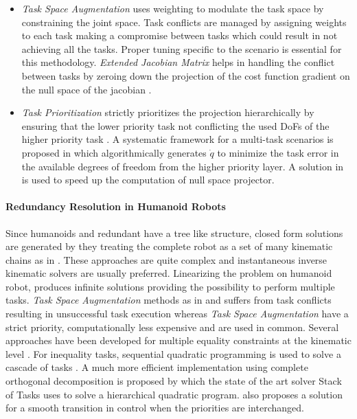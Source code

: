  \begin{itemize}
     \item \textit{Task Space Augmentation} uses weighting to modulate the task space by constraining the joint space\cite{sciavicco1987solving}. Task conflicts are managed by assigning weights to each task making a compromise between tasks which could 
     result in not achieving all the tasks. Proper tuning specific to the scenario is essential for this methodology. \textit{Extended Jacobian Matrix} helps in handling the conflict between tasks by zeroing down the projection of the cost function gradient on the null space of the jacobian \cite{baillieul1985kinematic}.

     \item \textit{Task Prioritization} strictly prioritizes the projection hierarchically by ensuring that the lower priority task not conflicting the used DoFs of the higher priority task \cite{nakamura1987task}. A systematic framework for a multi-task scenarios is proposed in \cite{siciliano1991general} which algorithmically generates $\dot{q}$ to minimize the task error in the available degrees of freedom from the higher priority layer. A solution in \cite{Baerlocher1998} is used to speed up the computation of null space projector. 
     
 \end{itemize}

\paragraph{Redundancy Resolution in Humanoid Robots}
Since humanoids and redundant have a tree like structure, closed form solutions are generated by they treating the complete robot as a set of many kinematic chains as in \cite{ali2010closed,nunez2012explicit}. These approaches are quite complex and instantaneous inverse kinematic solvers are usually preferred. Linearizing the problem on humanoid robot, produces infinite solutions providing the possibility to perform multiple tasks. \textit{Task Space Augmentation} methods as in \cite{tevatia2000inverse} and \cite{salini2009lqp}suffers from task conflicts resulting in unsuccessful task execution whereas \textit{Task Space Augmentation} have a strict priority, computationally less expensive and are used in common. Several approaches have been developed for multiple equality constraints at the kinematic level \cite{yoshida2006task,mansard2007task,gienger2005task}. For inequality tasks, sequential quadratic programming is used to solve a cascade of tasks \cite{kanoun2009prioritizing}. A much more efficient implementation using complete orthogonal decomposition
is proposed by \cite{Escande2014} which the state of the art solver Stack of Tasks uses to solve a hierarchical quadratic program. \cite{jarquin2013real} also proposes a solution for a smooth transition in control when the priorities are interchanged.  



